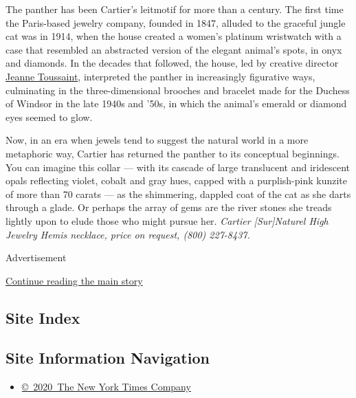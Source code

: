 The panther has been Cartier's leitmotif for more than a century. The
first time the Paris-based jewelry company, founded in 1847, alluded to
the graceful jungle cat was in 1914, when the house created a women's
platinum wristwatch with a case that resembled an abstracted version of
the elegant animal's spots, in onyx and diamonds. In the decades that
followed, the house, led by creative director
\href{https://www.nytimes3xbfgragh.onion/2020/03/16/t-magazine/cartier-mauna-necklace.html}{Jeanne
Toussaint}, interpreted the panther in increasingly figurative ways,
culminating in the three-dimensional brooches and bracelet made for the
Duchess of Windsor in the late 1940s and '50s, in which the animal's
emerald or diamond eyes seemed to glow.

Now, in an era when jewels tend to suggest the natural world in a more
metaphoric way, Cartier has returned the panther to its conceptual
beginnings. You can imagine this collar --- with its cascade of large
translucent and iridescent opals reflecting violet, cobalt and gray
hues, capped with a purplish-pink kunzite of more than 70 carats --- as
the shimmering, dappled coat of the cat as she darts through a glade. Or
perhaps the array of gems are the river stones she treads lightly upon
to elude those who might pursue her. \emph{Cartier {[}Sur{]}Naturel High
Jewelry Hemis necklace, price on request, (800) 227-8437.}

Advertisement

\protect\hyperlink{after-bottom}{Continue reading the main story}

\hypertarget{site-index}{%
\subsection{Site Index}\label{site-index}}

\hypertarget{site-information-navigation}{%
\subsection{Site Information
Navigation}\label{site-information-navigation}}

\begin{itemize}
\tightlist
\item
  \href{https://help.nytimes3xbfgragh.onion/hc/en-us/articles/115014792127-Copyright-notice}{©~2020~The
  New York Times Company}
\end{itemize}

